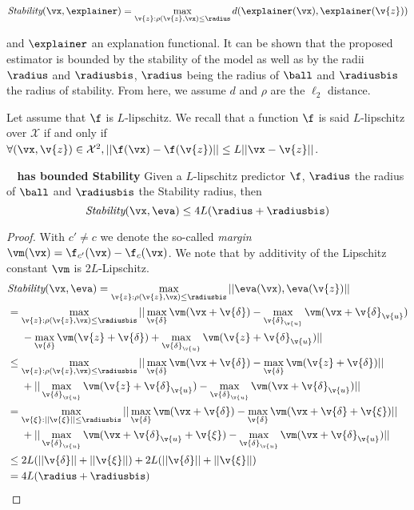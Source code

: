 $$
\textit{Stability}(\vx, \explainer) = \max_{\v{z} : \rho(\v{z}, \vx) \leq \radius} d( \explainer(\vx), \explainer(\v{z}) ) 
$$

and $\explainer$ an explanation functional.
It can be shown that the proposed ~\eva~ estimator is bounded by the stability of the model as well as by the radii $\radius$ and $\radiusbis$, $\radius$ being the radius of $\ball$ and $\radiusbis$ the radius of stability.
From here, we assume $d$ and $\rho$ are the $\ell_2$ distance.

Let assume that $\f$ is $L$-lipschitz. We recall that a function $\f$ is said $L$-lipschitz over $\mathcal{X}$ if and only if $\forall (\vx, \v{z}) \in \mathcal{X}^2, || \f(\vx) - \f(\v{z}) || \leq L || \vx - \v{z} ||$.


\begin{theorem}\textbf{\eva~ has bounded Stability}
\label{app:eva:stab}
Given a $L$-lipschitz predictor $\f$, $\radius$ the radius of $\ball$ and $\radiusbis$ the Stability radius, then
$$
\textit{Stability}(\vx, \eva) \leq 4L(\radius + \radiusbis)
$$
\end{theorem}

\begin{proof}
With $c' \neq c$ we denote the so-called \textit{margin} $\vm(\vx) = \f_{c'}(\vx) - \f_{c}(\vx)$. We note that by additivity of the Lipschitz constant $\vm$ is 2$L$-Lipschitz.
\begin{align*} 
&\textit{Stability}(\vx, \eva) = \max_{\v{z} : \rho(\v{z}, \vx) \leq \radiusbis} || \eva(\vx), \eva(\v{z}) || \\
  &= \max_{\v{z} : \rho(\v{z}, \vx) \leq \radiusbis} 
  ||\max_{\v{\delta}} \vm(\vx + \v{\delta}) 
  - \max_{\v{\delta}_{\v{u}}} \vm(\vx + \v{\delta}_{\v{u}}) \\
  &~~~~- \max_{\v{\delta}} \vm(\v{z} + \v{\delta})
  + \max_{\v{\delta}_{\v{u}}} \vm(\v{z} + \v{\delta}_{\v{u}}) || \\
  &\leq \max_{\v{z} : \rho(\v{z}, \vx) \leq \radiusbis} 
  ||\max_{\v{\delta}} \vm(\vx + \v{\delta}) 
  - \max_{\v{\delta}} \vm(\v{z} + \v{\delta}) || \\
  &~~~~+ || \max_{\v{\delta}_{\v{u}}} \vm(\v{z} + \v{\delta}_{\v{u}}) 
  - \max_{\v{\delta}_{\v{u}}} \vm(\vx + \v{\delta}_{\v{u}}) || \\
  &= \max_{\v{\xi} : ||\v{\xi}|| \leq \radiusbis} 
  ||\max_{\v{\delta}} \vm(\vx + \v{\delta}) 
  - \max_{\v{\delta}} \vm(\vx + \v{\delta} + \v{\xi}) || \\
  &~~~~+ || \max_{\v{\delta}_{\v{u}}} \vm(\vx + \v{\delta}_{\v{u}} + \v{\xi}) 
  - \max_{\v{\delta}_{\v{u}}} \vm(\vx + \v{\delta}_{\v{u}}) || \\
  &\leq 2L (||\v{\delta}|| + ||\v{\xi}||) + 2L (||\v{\delta}|| + ||\v{\xi}||)\\
  &= 4L (\radius + \radiusbis)
\end{align*}

\end{proof}

